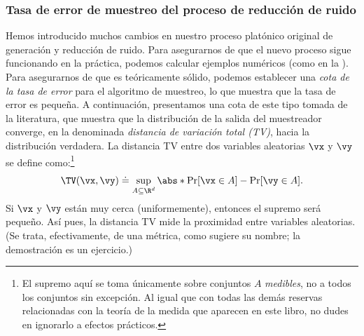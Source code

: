 \documentclass[../../book-main.tex]{subfiles}
\begin{document}
\subsubsection{Tasa de error de muestreo del proceso de reducción de ruido}
Hemos introducido muchos cambios en nuestro proceso platónico original de generación y reducción de ruido.
Para asegurarnos de que el nuevo proceso sigue funcionando en
la práctica, podemos calcular ejemplos numéricos (como
en la ). Para asegurarnos de que es
teóricamente sólido, podemos establecer una \textit{cota de la tasa de error}
para el algoritmo de muestreo, lo que muestra que la tasa de error es pequeña.
A continuación, presentamos una cota de este tipo tomada de la literatura, que muestra que la
distribución de la salida del muestreador converge, en la denominada
\textit{distancia de variación total (TV)}, hacia la distribución verdadera. La
distancia TV entre dos variables aleatorias \(\vx\) y
\(\vy\) se define como:\footnote{El supremo aquí se toma únicamente sobre
    conjuntos \(A\) \textit{medibles}, no a todos los conjuntos sin excepción. Al igual que con todas las
    demás reservas relacionadas con la teoría de la medida que aparecen en este libro, no dudes en
ignorarlo a efectos prácticos.}
\begin{equation}
    \TV(\vx, \vy) \doteq \sup_{A \subseteq \R^{d}}\abs*{\Pr[\vx \in
    A] - \Pr[\vy \in A]}.
\end{equation}
Si \(\vx\) y \(\vy\) están muy cerca (uniformemente), entonces el supremo
será pequeño. Así pues, la distancia TV mide la proximidad entre
variables aleatorias. (Se trata, efectivamente, de una métrica, como sugiere su nombre; la demostración es
un ejercicio.)
\end{document}
